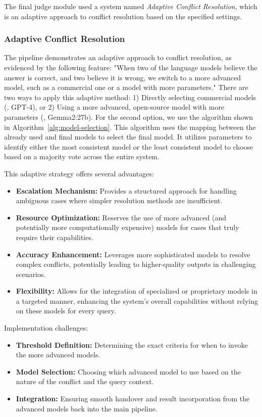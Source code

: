 The final judge module used a system named \textit{Adaptive Conflict Resolution}, which is an adaptive approach to conflict resolution based on the specified settings.

\subsubsection{Adaptive Conflict Resolution}
The pipeline demonstrates an adaptive approach to conflict resolution, as evidenced by the following feature:
"When two of the language models believe the answer is correct, and two believe it is wrong, we switch to a more advanced model, such as a commercial one or a model with more parameters."
There are two ways to apply this adaptive method: 1) Directly selecting commercial models (\eg, GPT-4), or 2) Using a more advanced, open-source model with more parameters (\eg, Gemma2:27b).
For the second option, we use the algorithm shown in Algorithm~\ref{alg:model-selection}.
This algorithm uses the mapping between the already used and final models to select the final model.
It utilizes parameters to identify either the most consistent model or the least consistent model to choose based on a majority vote across the entire system.

This adaptive strategy offers several advantages:
\begin{itemize}
    \item \textbf{Escalation Mechanism:} Provides a structured approach for handling ambiguous cases where simpler resolution methods are insufficient.
    \item \textbf{Resource Optimization:} Reserves the use of more advanced (and potentially more computationally expensive) models for cases that truly require their capabilities.
    \item \textbf{Accuracy Enhancement:} Leverages more sophisticated models to resolve complex conflicts, potentially leading to higher-quality outputs in challenging scenarios.
    \item \textbf{Flexibility:} Allows for the integration of specialized or proprietary models in a targeted manner, enhancing the system's overall capabilities without relying on these models for every query.
\end{itemize}

Implementation challenges:
\begin{itemize}
    \item \textbf{Threshold Definition:} Determining the exact criteria for when to invoke the more advanced models.
    \item \textbf{Model Selection:} Choosing which advanced model to use based on the nature of the conflict and the query context.
    \item \textbf{Integration:} Ensuring smooth handover and result incorporation from the advanced models back into the main pipeline.
\end{itemize}

